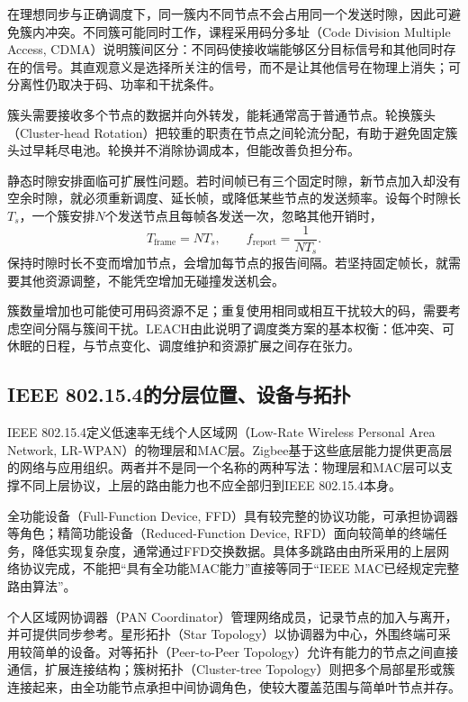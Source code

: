 在理想同步与正确调度下，同一簇内不同节点不会占用同一个发送时隙，因此可避免簇内冲突。不同簇可能同时工作，课程采用码分多址（Code Division Multiple Access, CDMA）说明簇间区分：不同码使接收端能够区分目标信号和其他同时存在的信号。其直观意义是选择所关注的信号，而不是让其他信号在物理上消失；可分离性仍取决于码、功率和干扰条件。

簇头需要接收多个节点的数据并向外转发，能耗通常高于普通节点。轮换簇头（Cluster-head Rotation）把较重的职责在节点之间轮流分配，有助于避免固定簇头过早耗尽电池。轮换并不消除协调成本，但能改善负担分布。

静态时隙安排面临可扩展性问题。若时间帧已有三个固定时隙，新节点加入却没有空余时隙，就必须重新调度、延长帧，或降低某些节点的发送频率。设每个时隙长$T_s$，一个簇安排$N$个发送节点且每帧各发送一次，忽略其他开销时，
\begin{equation}
 T_{\mathrm{frame}}=NT_s,\qquad
 f_{\mathrm{report}}=\frac{1}{NT_s}.
\end{equation}
保持时隙时长不变而增加节点，会增加每节点的报告间隔。若坚持固定帧长，就需要其他资源调整，不能凭空增加无碰撞发送机会。

簇数量增加也可能使可用码资源不足；重复使用相同或相互干扰较大的码，需要考虑空间分隔与簇间干扰。LEACH由此说明了调度类方案的基本权衡：低冲突、可休眠的日程，与节点变化、调度维护和资源扩展之间存在张力。

\subsection{IEEE 802.15.4的分层位置、设备与拓扑}

IEEE 802.15.4定义低速率无线个人区域网（Low-Rate Wireless Personal Area Network, LR-WPAN）的物理层和MAC层。Zigbee基于这些底层能力提供更高层的网络与应用组织。两者并不是同一个名称的两种写法：物理层和MAC层可以支撑不同上层协议，上层的路由能力也不应全部归到IEEE 802.15.4本身。

全功能设备（Full-Function Device, FFD）具有较完整的协议功能，可承担协调器等角色；精简功能设备（Reduced-Function Device, RFD）面向较简单的终端任务，降低实现复杂度，通常通过FFD交换数据。具体多跳路由由所采用的上层网络协议完成，不能把“具有全功能MAC能力”直接等同于“IEEE MAC已经规定完整路由算法”。

个人区域网协调器（PAN Coordinator）管理网络成员，记录节点的加入与离开，并可提供同步参考。星形拓扑（Star Topology）以协调器为中心，外围终端可采用较简单的设备。对等拓扑（Peer-to-Peer Topology）允许有能力的节点之间直接通信，扩展连接结构；簇树拓扑（Cluster-tree Topology）则把多个局部星形或簇连接起来，由全功能节点承担中间协调角色，使较大覆盖范围与简单叶节点并存。

